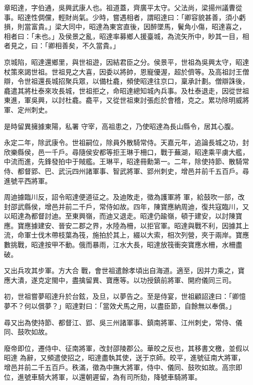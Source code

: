 \begin{pinyinscope}
 章昭達，字伯通，吳興武康人也。祖道蓋，齊廣平太守。父法尚，梁揚州議曹從事。昭達性倜儻，輕財尚氣。少時，嘗遇相者，謂昭達曰：「卿容貌甚善，須小虧損，則當富貴。」梁大同中，昭達為東宮直後，因醉墜馬，鬢角小傷，昭達喜之，相者曰：「未也。」及侯景之亂，昭達率募鄉人援臺城，為流矢所中，眇其一目，相者見之，曰：「卿相善矣，不久當貴。」



 京城陷，昭達還鄉里，與世祖遊，因結君臣之分。侯景平，世祖為吳興太守，昭達杖策來謁世祖。世祖見之大喜，因委以將帥，恩寵優渥，超於儕等。及高祖討王僧辯，令世祖還長城招聚兵眾，以備杜龕，頻使昭達往京口，稟承計劃。僧辯誅後，龕遣其將杜泰來攻長城，世祖拒之，命昭達總知城內兵事。及杜泰退走，因從世祖東進，軍吳興，以討杜龕。龕平，又從世祖東討張彪於會稽，克之。累功除明威將軍、定州刺史。



 是時留異擁據東陽，私署
 守宰，高祖患之，乃使昭達為長山縣令，居其心腹。



 永定二年，除武康令。世祖嗣位，除員外散騎常侍。天嘉元年，追論長城之功，封欣樂縣侯，邑一千戶。尋隨侯安都等拒王琳于柵口，戰于蕪湖，昭達乘平虜大艦，中流而進，先鋒發拍中于賊艦。王琳平，昭達冊勳第一。二年，除使持節、散騎常侍、都督郢、巴、武沅四州諸軍事、智武將軍、郢州刺史，增邑并前千五百戶。尋進號平西將軍。



 周迪據臨川反，詔令昭達便道征之。及迪敗走，徵為護軍將
 軍，給鼓吹一部，改封邵武縣侯，增邑并前二千戶，常侍如故。四年，陳寶應納周迪，復共寇臨川，又以昭達為都督討迪。至東興嶺，而迪又退走。昭達仍踰嶺，頓于建安，以討陳寶應。寶應據建安、晉安二郡之界，水陸為柵，以拒官軍。昭達與戰不利，因據其上流，命軍士伐木帶枝葉為筏，施拍於其上，綴以大索，相次列營，夾于兩岸。寶應數挑戰，昭達按甲不動。俄而暴雨，江水大長，昭達放筏衝突寶應水柵，水柵盡破。



 又出兵攻其步軍。方大合
 戰，會世祖遣餘孝頃出自海道。適至，因并力乘之，寶應大潰，遂克定閩中，盡擒留異、寶應等。以功授鎮前將軍、開府儀同三司。



 初，世祖嘗夢昭達升於台鉉，及旦，以夢告之。至是侍宴，世祖顧詔達曰：「卿憶夢不？何以償夢？」昭達對曰：「當效犬馬之用，以盡臣節，自餘無以奉償。」



 尋又出為使持節、都督江、郢、吳三州諸軍事、鎮南將軍、江州刺史，常侍、儀同、鼓吹如故。



 廢帝即位，遷侍中、征南將軍，改封邵陵郡公。華皎之反也，其移書文檄，並假以昭達
 為辭，又頻遣使招之，昭達盡執其使，送于京師。皎平，進號征南大將軍，增邑并前二千五百戶。秩滿，徵為中撫大將軍，侍中、儀同、鼓吹如故。高宗即位，進號車騎大將軍，以還朝遲留，為有司所劾，降號車騎將軍。




\end{pinyinscope}
